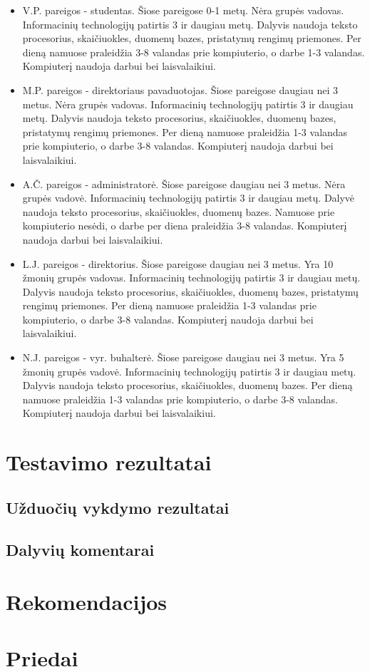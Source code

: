 		\begin{itemize}
			\item V.P. pareigos - studentas. Šiose pareigose 0-1 metų. Nėra grupės vadovas. Informacinių technologijų patirtis 3 ir daugiau metų.
			Dalyvis naudoja teksto procesorius, skaičiuokles, duomenų bazes, pristatymų rengimų priemones.
			Per dieną namuose praleidžia 3-8 valandas prie kompiuterio, o darbe 1-3 valandas.
			Kompiuterį naudoja darbui bei laisvalaikiui.
			\item M.P. pareigos - direktoriaus pavaduotojas. Šiose pareigose daugiau nei 3 metus. Nėra grupės vadovas. Informacinių technologijų patirtis 3 ir daugiau metų.
			Dalyvis naudoja teksto procesorius, skaičiuokles, duomenų bazes, pristatymų rengimų priemones.
			Per dieną namuose praleidžia 1-3 valandas prie kompiuterio, o darbe 3-8 valandas.
			Kompiuterį naudoja darbui bei laisvalaikiui.
			\item A.Č. pareigos - administratorė. Šiose pareigose daugiau nei 3 metus. Nėra grupės vadovė. Informacinių technologijų patirtis 3 ir daugiau metų.
			Dalyvė naudoja teksto procesorius, skaičiuokles, duomenų bazes.
			Namuose prie kompiuterio nesėdi, o darbe per diena praleidžia 3-8 valandas.
			Kompiuterį naudoja darbui bei laisvalaikiui.
			\item L.J. pareigos - direktorius. Šiose pareigose daugiau nei 3 metus. Yra 10 žmonių grupės vadovas. Informacinių technologijų patirtis 3 ir daugiau metų.
			Dalyvis naudoja teksto procesorius, skaičiuokles, duomenų bazes, pristatymų rengimų priemones.
			Per dieną namuose praleidžia 1-3 valandas prie kompiuterio, o darbe 3-8 valandas.
			Kompiuterį naudoja darbui bei laisvalaikiui.
			\item N.J. pareigos - vyr. buhalterė. Šiose pareigose daugiau nei 3 metus. Yra 5 žmonių grupės vadovė. Informacinių technologijų patirtis 3 ir daugiau metų.
			Dalyvis naudoja teksto procesorius, skaičiuokles, duomenų bazes.
			Per dieną namuose praleidžia 1-3 valandas prie kompiuterio, o darbe 3-8 valandas.
			Kompiuterį naudoja darbui bei laisvalaikiui.
		\end{itemize}
	

\section{Testavimo rezultatai}

	\subsection{Užduočių vykdymo rezultatai}
	
	\subsection{Dalyvių komentarai}

\section{Rekomendacijos}

	

\section{Priedai}

